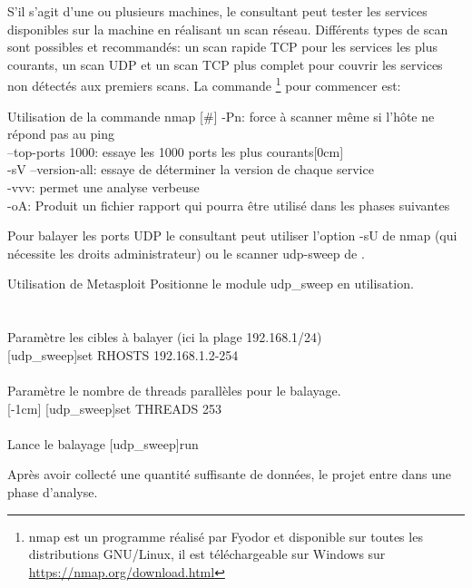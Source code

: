 \documentclass[twoside,a4paper,12pt,titlepage]{book}
\newcommand{\MarginPar}[2]{\marginnote{\scriptsize #1}[#2]}
\begin{document}
	S'il s'agit d'une ou plusieurs machines, le consultant peut tester les services disponibles sur la machine en réalisant un scan réseau. Différents types de scan sont possibles et recommandés: un scan rapide TCP pour les services les plus courants, un scan UDP et un scan TCP plus complet pour couvrir les services non détectés aux premiers scans. La commande \footnote{nmap est un programme réalisé par Fyodor et disponible sur toutes les distributions GNU/Linux, il est téléchargeable sur Windows sur \url{https://nmap.org/download.html}} pour commencer est:
\begin{FlagConsole}{Utilisation de la commande nmap}
[\#]
\tcblower
-Pn: force à scanner même si l'hôte ne répond pas au ping\\
--top-ports 1000: essaye les 1000 ports les plus courants\MarginPar{\textbf{Scan Réseau TCP}}{0cm}\\
-sV --version-all: essaye de déterminer la version de chaque service\\
-vvv: permet une analyse verbeuse\\
-oA: Produit un fichier rapport qui pourra être utilisé dans les phases suivantes
\end{FlagConsole}

Pour balayer les ports UDP le consultant peut utiliser l'option -sU de nmap (qui nécessite les droits administrateur) ou le scanner udp-sweep de .
\begin{FlagConsole}{Utilisation de Metasploit}
	Positionne le module udp\_sweep en utilisation.\\
	\\
	 \\
	Paramètre les cibles à balayer (ici la plage 192.168.1/24)\\
	[udp\_sweep]{set RHOSTS 192.168.1.2-254}\\
	 \\
	 Paramètre le nombre de threads parallèles pour le balayage.\\
	 \MarginPar{\textbf{Scan Réseau UDP}}{-1cm}
	[udp\_sweep]{set THREADS 253}\\
	 \\
	Lance le balayage
	[udp\_sweep]{run}\\
\end{FlagConsole}
Après avoir collecté une quantité suffisante de données, le projet entre dans une phase d'analyse.
\end{document}
